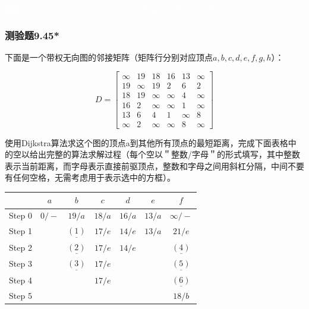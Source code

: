 \documentclass[UTF8, heading=true]{ctexart}
\begin{document}
\textcolor{white}{答案：(1) $20 / b$
(2) $17 / d$
(3) $17 / d$
(4) $28 / g$
(5) $25 / f$
(6) $25 / f$}

\subsubsection{测验题9.45*}

下面是一个带权无向图的邻接矩阵（矩阵行分别对应顶点$a,b,c,d,e,f,g,h$）：


\begin{table}[H]
\renewcommand{\arraystretch}{1.5}
  $$
D=\left[\begin{array}{cccccc}
\infty & 19 & 18 & 16 & 13 & \infty \\
19 & \infty & 19 & 2 & 6 & 2 \\
18 & 19 & \infty & \infty & 4 & \infty \\
16 & 2 & \infty & \infty & 1 & \infty \\
13 & 6 & 4 & 1 & \infty & 8 \\
\infty & 2 & \infty & \infty & 8 & \infty
\end{array}\right]
$$
\end{table}

使用Dijkstra算法求这个图的顶点a到其他所有顶点的最短距离，完成下面表格中的空以给出完整的算法求解过程（每个空以＂整数/字母＂的形式填写，其中整数表示当前距离，而字母表示直接前驱顶点，整数和字母之间用斜杠分隔，中间不要有任何空格，无需考虑用于表示选中的方框）。

\begin{table}[H]
\renewcommand{\arraystretch}{1.5}
\centering

\begin{tabular}{c|c|c|c|c|c|c}
  \hline  & $a$ & $b$ & $c$ & $d$ & $e$ & $f$ \\
  \hline Step  0 & $\boxed{0} /-$ & $19 / a$ & $18 / a$ & $16 / a$ & $13 / a$ & $\infty /-$ \\
  \hline Step  1 & & $\underline{(1)}$ & $17 / e$ & $14 / e$ & $\boxed{13} / a$ & $21 / e$ \\
  \hline Step  2 & & $\underline{(2)}$ & $17 / e$ & $\boxed{14} / e$ & & $\underline{(4)}$ \\
  \hline Step  3 & & $\underline{(3)}$ & $17 / e$ & & & $\underline{(5)}$ \\
  \hline Step  4 & & & $\boxed{17} / e$ & & & $\underline{(6)}$ \\
  \hline Step  5 & & & & & & $\boxed{18} / b$ \\
  \hline
\end{tabular}

\end{table}
\end{document}
